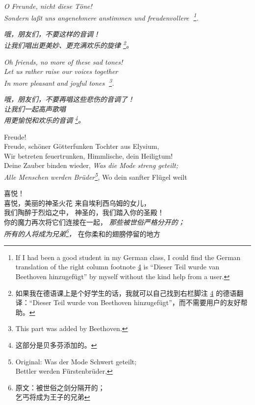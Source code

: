 \begin{paracol}{4}
\begin{Gverse}
\itshape O Freunde, nicht diese T\"one! \\
Sondern la{\ss}t uns angenehmere anstimmen und freu\-denvollere
\footnote{If I had been a good student in my German class, I could find
the German translation of the right column footnote \ref{fn:right4} is
``Dieser Teil wurde van Beethoven hinzugef\"ugt'' by myself without
the kind help from a user.}.
\end{Gverse}
\begin{CGverse}
\itshape 哦，朋友们，不要这样的音调！ \\
让我们唱出更美妙、更充满欢乐的旋律%
\footnote{如果我在德语课上是个好学生的话，我就可以自己找到右栏脚注 \ref{fn:right4} 的德语翻译：“Dieser Teil wurde von Beethoven hinzugefügt”，而不需要用户的友好帮助。}。
\end{CGverse}
\begin{Everse}
\itshape Oh friends, no more of these sad tones!\\
Let us rather raise our voices together\\
In more pleasant and joyful tones
\footnote{This part was added by Beethoven.\label{fn:right4}}.
\end{Everse}
\begin{CEverse}
\itshape 哦，朋友们，不要再唱这些悲伤的音调了！\\
让我们一起高声歌唱\\
用更愉悦和欢乐的音调
\footnote{这部分是贝多芬添加的。\label{fn:right4}}。
\end{CEverse}


\begin{Gverse}
Freude!\\
Freude, sch\"oner G\"otterfunken
Tochter aus Elysium,\\
Wir betreten feuertrunken,
Himmlische, dein Heiligtum!\\
Deine Zauber binden wieder,
{\itshape Was die Mode streng geteilt;\\
Alle Menschen werden Br\"uder\footnote{
Original: Was der Mode Schwert geteilt;\\
Bettler werden F\"urstenbr\"uder,},}
Wo dein sanfter Fl\"u\-gel weilt
\end{Gverse}
\begin{CGverse}
喜悦！\\
喜悦，美丽的神圣火花
来自埃利西乌姆的女儿，\\
我们陶醉于烈焰之中，
神圣的，我们踏入你的圣殿！\\
你的魔力再次将它们连接在一起，
{\itshape 那些被世俗严格分开的；\\
所有的人将成为兄弟\footnote{原文：被世俗之剑分隔开的；\\
乞丐将成为王子的兄弟}，}
在你柔和的翅膀停留的地方
\end{CGverse}


\end{paracol}
